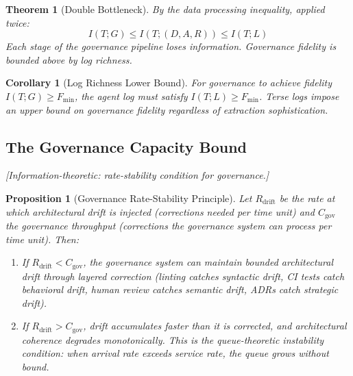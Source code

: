 \documentclass[11pt, a4paper]{googledeepmind}
\newtheorem{theorem}{Theorem}[section]
\newtheorem{proposition}{Proposition}[section]
\newtheorem{corollary}{Corollary}[section]
\begin{document}
\begin{theorem}[Double Bottleneck]
\label{thm:double-bottleneck}
By the data processing inequality, applied twice:
\begin{equation}
    I(T; G) \leq I(T; (D, A, R)) \leq I(T; L)
\end{equation}
Each stage of the governance pipeline loses information. Governance fidelity is bounded above by log richness.
\end{theorem}

\begin{corollary}[Log Richness Lower Bound]
For governance to achieve fidelity $I(T; G) \geq F_{\min}$, the agent log must satisfy $I(T; L) \geq F_{\min}$. Terse logs impose an upper bound on governance fidelity regardless of extraction sophistication.
\end{corollary}

\subsection{The Governance Capacity Bound}
\emph{[Information-theoretic: rate-stability condition for governance.]}

\begin{proposition}[Governance Rate-Stability Principle]
\label{thm:governance-capacity}
Let $R_{\text{drift}}$ be the rate at which architectural drift is injected (corrections needed per time unit) and $C_{\text{gov}}$ the governance throughput (corrections the governance system can process per time unit). Then:
\begin{enumerate}
    \item If $R_{\text{drift}} < C_{\text{gov}}$, the governance system can maintain bounded architectural drift through layered correction (linting catches syntactic drift, CI tests catch behavioral drift, human review catches semantic drift, ADRs catch strategic drift).
    \item If $R_{\text{drift}} > C_{\text{gov}}$, drift accumulates faster than it is corrected, and architectural coherence degrades monotonically. This is the queue-theoretic instability condition: when arrival rate exceeds service rate, the queue grows without bound.
\end{enumerate}
\end{proposition}
\end{document}
